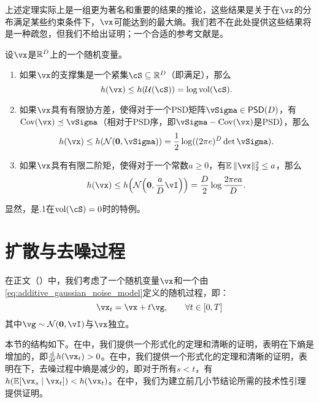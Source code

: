 \documentclass[../../book-main.tex]{subfiles}
\begin{document}
上述定理实际上是一组更为著名和重要的结果的推论，这些结果是关于在\(\vx\)的分布满足某些约束条件下，\(\vx\)可能达到的最大熵。我们若不在此处提供这些结果将是一种疏忽，但我们不给出证明；一个合适的参考文献是\cite{poliyanski2024information}。
\begin{theorem}\label{thmx:max_entropy}
    设\(\vx\)是\(\mathbb{R}^{D}\)上的一个随机变量。
    \begin{enumerate}
        \item 如果\(\vx\)的支撑集是一个紧集\(\cS \subseteq \R^{D}\)（即满足），那么
        \begin{equation}
            h(\vx) \leq h(\dUnif(\cS)) = \log \volume(\cS).
        \end{equation}
        \item 如果\(\vx\)具有有限协方差，使得对于一个PSD矩阵\(\vSigma \in \PSD(D)\)，有\(\Cov(\vx) \preceq \vSigma\)（相对于PSD序，即\(\vSigma - \Cov(\vx)\)是PSD），那么
        \begin{equation}
            h(\vx) \leq h(\dNorm(\vzero, \vSigma)) = \frac{1}{2}\log((2\pi e)^{D}\det\vSigma).
        \end{equation}
        \item 如果\(\vx\)具有有限二阶矩，使得对于一个常数\(a \geq 0\)，有\(\Ex\norm{\vx}_{2}^{2} \leq a\)，那么
        \begin{equation}
            h(\vx) \leq h\rp{\dNorm\rp{\vzero, \frac{a}{D}\vI}} = \frac{D}{2}\log\frac{2\pi e a}{D}.
        \end{equation}
    \end{enumerate}
\end{theorem}
显然，是.1在\(\volume(\cS) = 0\)时的特例。

\section{扩散与去噪过程}\label{sec:entropy_diffusion}

在正文（）中，我们考虑了一个随机变量\(\vx\)和一个由\eqref{eq:additive_gaussian_noise_model}定义的随机过程，即：
\begin{equation}\label{eq:app_additive_gaussian_noise_model}
    \vx_{t} = \vx + t\vg, \qquad  \forall t \in [0, T]
\end{equation}
其中\(\vg \sim \dNorm(\vzero, \vI)\)与\(\vx\)独立。

本节的结构如下。在中，我们提供一个形式化的定理和清晰的证明，表明在下熵是增加的，即\(\odv*{h(\vx_{t})}{t} > 0\)。在中，我们提供一个形式化的定理和清晰的证明，表明在下，去噪过程中熵是减少的，即对于所有\(s < t\)，有\(h(\Ex[\vx_{s} \given \vx_{t}]) < h(\vx_{t})\)。在中，我们为建立前几小节结论所需的技术性引理提供证明。
\end{document}
